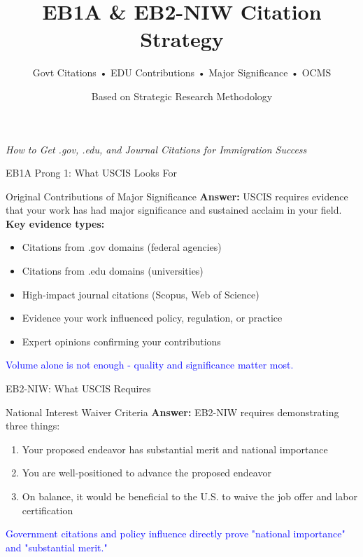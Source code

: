 \documentclass[11pt]{beamer}
\title{EB1A \& EB2-NIW Citation Strategy}
\subtitle{Govt Citations • EDU Contributions • Major Significance • OCMS}
\author{Based on Strategic Research Methodology}
\date{}
\begin{document}
	
	\begin{frame}
		\titlepage
		\centering
		\small \textit{How to Get .gov, .edu, and Journal Citations for Immigration Success}
	\end{frame}
	
	
	\begin{frame}{EB1A Prong 1: What USCIS Looks For}
		\small
		\begin{block}{Original Contributions of Major Significance}
			\textbf{Answer:} USCIS requires evidence that your work has had major significance and sustained acclaim in your field.
			\vspace{0.1cm}
			\textbf{Key evidence types:}
			\begin{itemize}
				\item Citations from .gov domains (federal agencies)
				\item Citations from .edu domains (universities)
				\item High-impact journal citations (Scopus, Web of Science)
				\item Evidence your work influenced policy, regulation, or practice
				\item Expert opinions confirming your contributions
			\end{itemize}
			\textcolor{blue}{Volume alone is not enough - quality and significance matter most.}
		\end{block}
	\end{frame}
	
	\begin{frame}{EB2-NIW: What USCIS Requires}
		\small
		\begin{block}{National Interest Waiver Criteria}
			\textbf{Answer:} EB2-NIW requires demonstrating three things:
			\vspace{0.1cm}
			\begin{enumerate}
				\item Your proposed endeavor has substantial merit and national importance
				\item You are well-positioned to advance the proposed endeavor
				\item On balance, it would be beneficial to the U.S. to waive the job offer and labor certification
			\end{enumerate}
			\textcolor{blue}{Government citations and policy influence directly prove "national importance" and "substantial merit."}
		\end{block}
	\end{frame}
	
\end{document}
